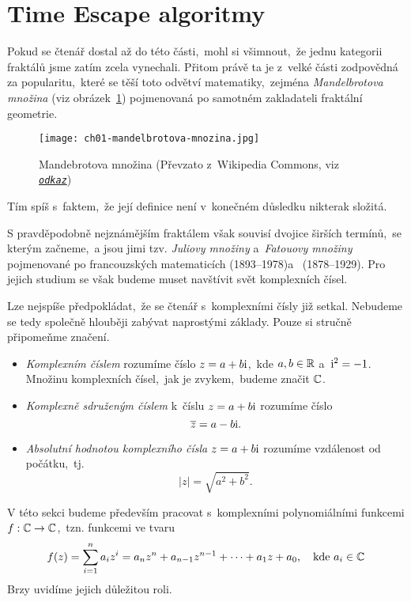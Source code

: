 \section{Time Escape algoritmy}\label{sec:tea}

Pokud se čtenář dostal až do této části,~mohl si všimnout,~že jednu kategorii fraktálů jsme zatím zcela vynechali. Přitom právě ta je z~velké části zodpovědná za popularitu,~které se těší toto odvětví matematiky,~zejména \emph{Mandelbrotova množina} (viz obrázek~\ref{fig:mandebrotova-mnozina}) pojmenovaná po samotném zakladateli fraktální geometrie.
\begin{figure}[h]
    \centering
    \texttt{[image: ch01-mandelbrotova-mnozina.jpg]}
    \caption[Mandebrotova množina]{Mandebrotova množina (Převzato z~Wikipedia Commons, viz \href{https://en.wikipedia.org/wiki/Mandelbrot\_set\#/media/File:Mandel\_zoom\_00\_mandelbrot\_set.jpg}{\texttt{\textit{odkaz}}})}
    \label{fig:mandebrotova-mnozina}
\end{figure}
Tím spíš s~faktem,~že její definice není v~konečném důsledku nikterak složitá.

S pravděpodobně nejznámějším fraktálem však souvisí dvojice širších termínů,~se kterým začneme,~a jsou jimi tzv. \emph{Juliovy množiny} a~\emph{Fatouovy množiny} pojmenované po francouzských matematicích  (1893--1978)\linebreak a~ (1878--1929). Pro jejich studium se však budeme muset navštívit svět komplexních čísel.

Lze nejspíše předpokládat,~že se čtenář s~komplexními čísly již setkal. Nebudeme se tedy společně hlouběji zabývat naprostými základy. Pouze si stručně připomeňme značení.
\begin{itemize}
    \item \emph{Komplexním číslem} rozumíme číslo $z=a+b\textrm{i}$,~kde $a,b\in\mathbb{R}$ a~$\textrm{i}^2=-1$. Množinu komplexních čísel,~jak je zvykem,~budeme značit $\mathbb{C}$.
    \item \emph{Komplexně sdruženým číslem} k~číslu $z=a+b\textrm{i}$ rozumíme číslo
    \[\overline{z}=a-b\textrm{i}.\]
    \item \emph{Absolutní hodnotou komplexního čísla} $z=a+b\textrm{i}$ rozumíme vzdálenost od počátku,~tj.
    \[|z|=\sqrt{a^2+b^2}.\]
\end{itemize}
V této sekci budeme především pracovat s~komplexními polynomiálními funkcemi $f:\mathbb{C} \rightarrow \mathbb{C}$,~tzn. funkcemi ve tvaru
\[f(z)=\sum_{i=1}^{n}a_iz^i=a_nz^n+a_{n-1}z^{n-1}+\dots+a_1z+a_0,\quad\text{kde $a_i\in\mathbb{C}$}\]
Brzy uvidíme jejich důležitou roli.

